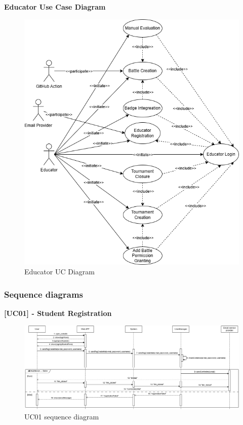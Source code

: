 \newpage

\textbf{Educator Use Case Diagram}
\begin{figure}[H]
    \centering
    \includegraphics[width=1\linewidth]{Images/UC_Educator.png}
    \caption{Educator UC Diagram}
    \label{fig:uc_educator}
\end{figure}

\newpage

\subsubsection{Sequence diagrams}

\textbf{[UC01] - Student Registration}
\begin{figure}[H]
    \centering
    \includegraphics[width=1\linewidth]{Images/SD_StudentRegistration.png}
    \caption{UC01 sequence diagram}
    \label{fig:uc01}
\end{figure}


